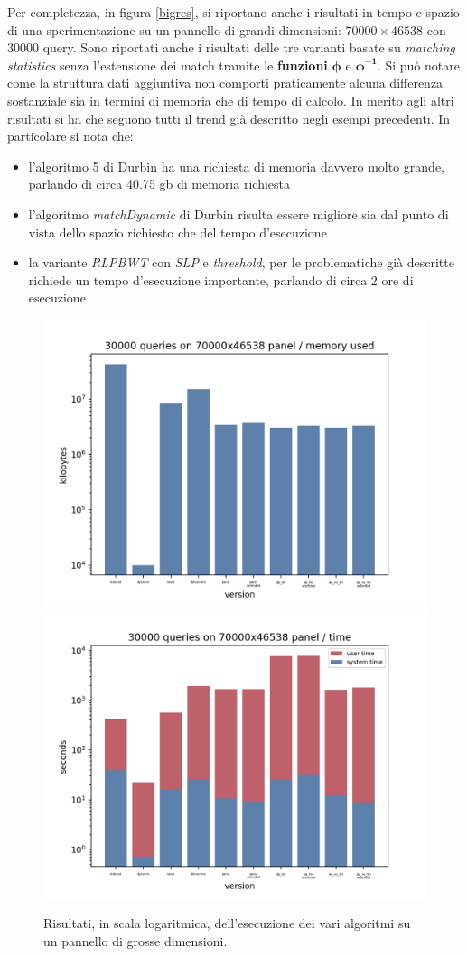 Per completezza, in figura \ref{bigres}, si riportano anche i risultati in tempo
e spazio di una sperimentazione su un pannello di grandi dimensioni:
$70000\times 46538$ con $30000$ query. Sono riportati anche i risultati delle
tre varianti basate su \textit{matching statistics} senza l'estensione dei match
tramite le \textbf{funzioni} $\boldsymbol \phi$ e
$\boldsymbol\phi^{\mathbf{-1}}$. Si può notare come la struttura dati aggiuntiva
non comporti praticamente alcuna differenza sostanziale sia in termini di
memoria che di tempo di calcolo. In merito agli altri risultati si ha che
seguono tutti il trend già descritto negli esempi precedenti. In particolare si
nota che:
\begin{itemize}
  \item l'algoritmo 5 di Durbin ha una richiesta di memoria davvero molto
  grande, parlando di circa 40.75 gb di memoria richiesta
  \item l'algoritmo \textit{matchDynamic} di Durbin risulta essere migliore sia
  dal punto di vista dello spazio richiesto che del tempo d'esecuzione
  \item la variante \textit{RLPBWT} con \textit{SLP} e \textit{threshold}, per
  le problematiche già descritte richiede un tempo d'esecuzione importante,
  parlando di circa 2 ore di esecuzione
\end{itemize}
\begin{figure}
  \centering
  \includegraphics[scale = 0.4]{img/mem.png}
  \includegraphics[scale = 0.4]{img/time.png}
  \caption{Risultati, in scala logaritmica, dell'esecuzione dei vari algoritmi
    su un pannello di grosse dimensioni.}
  \label{fig:bigres}
\end{figure}